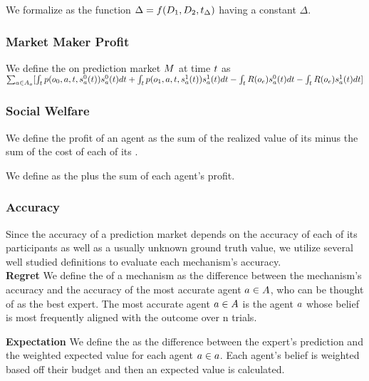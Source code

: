 \begin{enumerate}
We formalize  as the function $\Delta = f(D_{1},D_{2},t_{\Delta})$
having a constant $\Delta$.\\

\subsubsection{Market Maker Profit}
We define the  on prediction market $M$ at time $t$ as\\
$\sum_{a\in A_o} [
\int_{t} 
p(o_0,a,t, s^{0}_{a}(t))s^{0}_{a}(t)dt
+\int_{t} 
p(o_1,a,t, s^{1}_{a}(t))s^{1}_{a}(t)dt
-\int_{t} 
R(o_e)s^{0}_{a}(t)dt
-\int_{t}
R(o_e)s^{1}_{a}(t)dt]$

\subsubsection{Social Welfare}
We define the profit of an agent as the sum of the realized value of its  minus the
sum of the cost of each of its .

We define  as the  plus the sum of each agent's profit.

\subsubsection{Accuracy}
Since the accuracy of a prediction market depends on the accuracy of each of its participants
as well as a usually unknown ground truth value, we utilize several well studied definitions
to evaluate each mechanism's accuracy.\\

\textbf{Regret}
We define the  of a mechanism as the difference between the mechanism's accuracy
and the accuracy of the most accurate agent $a\in A$, who can be thought of as the
best expert. The most accurate agent $a\in A$ is the agent $a$ whose belief is
most frequently aligned with the outcome over n trials.

\textbf{Expectation}
We define the  as the difference between the expert's prediction
and the weighted expected value for each agent $a\in a$. Each agent's belief is weighted
based off their budget and then an expected value is calculated.


\end{enumerate}
